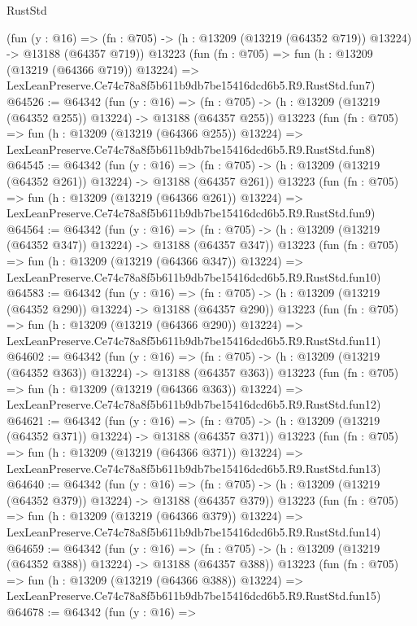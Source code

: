 \begin{lexlean}{RustStd}
\begin{coremodule}
    (fun (y : @16) =>
    (fn : @705) -> (h : @13209 (@13219 (@64352 @719)) @13224) -> @13188 (@64357 @719))
    @13223
    (fun (fn : @705) =>
    fun (h : @13209 (@13219 (@64366 @719)) @13224) =>
    LexLeanPreserve.Ce74c78a8f5b611b9db7be15416dcd6b5.R9.RustStd.fun7)
@64526 := @64342
    (fun (y : @16) =>
    (fn : @705) -> (h : @13209 (@13219 (@64352 @255)) @13224) -> @13188 (@64357 @255))
    @13223
    (fun (fn : @705) =>
    fun (h : @13209 (@13219 (@64366 @255)) @13224) =>
    LexLeanPreserve.Ce74c78a8f5b611b9db7be15416dcd6b5.R9.RustStd.fun8)
@64545 := @64342
    (fun (y : @16) =>
    (fn : @705) -> (h : @13209 (@13219 (@64352 @261)) @13224) -> @13188 (@64357 @261))
    @13223
    (fun (fn : @705) =>
    fun (h : @13209 (@13219 (@64366 @261)) @13224) =>
    LexLeanPreserve.Ce74c78a8f5b611b9db7be15416dcd6b5.R9.RustStd.fun9)
@64564 := @64342
    (fun (y : @16) =>
    (fn : @705) -> (h : @13209 (@13219 (@64352 @347)) @13224) -> @13188 (@64357 @347))
    @13223
    (fun (fn : @705) =>
    fun (h : @13209 (@13219 (@64366 @347)) @13224) =>
    LexLeanPreserve.Ce74c78a8f5b611b9db7be15416dcd6b5.R9.RustStd.fun10)
@64583 := @64342
    (fun (y : @16) =>
    (fn : @705) -> (h : @13209 (@13219 (@64352 @290)) @13224) -> @13188 (@64357 @290))
    @13223
    (fun (fn : @705) =>
    fun (h : @13209 (@13219 (@64366 @290)) @13224) =>
    LexLeanPreserve.Ce74c78a8f5b611b9db7be15416dcd6b5.R9.RustStd.fun11)
@64602 := @64342
    (fun (y : @16) =>
    (fn : @705) -> (h : @13209 (@13219 (@64352 @363)) @13224) -> @13188 (@64357 @363))
    @13223
    (fun (fn : @705) =>
    fun (h : @13209 (@13219 (@64366 @363)) @13224) =>
    LexLeanPreserve.Ce74c78a8f5b611b9db7be15416dcd6b5.R9.RustStd.fun12)
@64621 := @64342
    (fun (y : @16) =>
    (fn : @705) -> (h : @13209 (@13219 (@64352 @371)) @13224) -> @13188 (@64357 @371))
    @13223
    (fun (fn : @705) =>
    fun (h : @13209 (@13219 (@64366 @371)) @13224) =>
    LexLeanPreserve.Ce74c78a8f5b611b9db7be15416dcd6b5.R9.RustStd.fun13)
@64640 := @64342
    (fun (y : @16) =>
    (fn : @705) -> (h : @13209 (@13219 (@64352 @379)) @13224) -> @13188 (@64357 @379))
    @13223
    (fun (fn : @705) =>
    fun (h : @13209 (@13219 (@64366 @379)) @13224) =>
    LexLeanPreserve.Ce74c78a8f5b611b9db7be15416dcd6b5.R9.RustStd.fun14)
@64659 := @64342
    (fun (y : @16) =>
    (fn : @705) -> (h : @13209 (@13219 (@64352 @388)) @13224) -> @13188 (@64357 @388))
    @13223
    (fun (fn : @705) =>
    fun (h : @13209 (@13219 (@64366 @388)) @13224) =>
    LexLeanPreserve.Ce74c78a8f5b611b9db7be15416dcd6b5.R9.RustStd.fun15)
@64678 := @64342
    (fun (y : @16) =>

\end{coremodule}
\end{lexlean}
